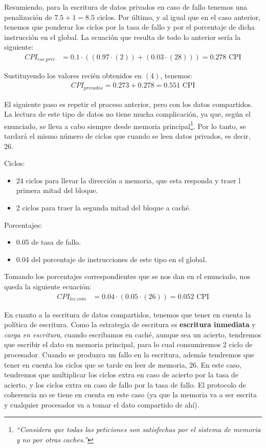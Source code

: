 \documentclass[12pt,a4paper]{article}
\begin{document}
Resumiendo, para la escritura de datos privados en caso de fallo tenemos una penalización de $7.5+1=8.5$ ciclos. Por último, y al igual que en el caso anterior, tenemos que ponderar los ciclos por la tasa de fallo y por el porcentaje de dicha instrucción en el global. La ecuación que resulta de todo lo anterior sería la siguiente:
\begin{align*}
CPI_{esc.priv}&=0.1\cdot ((0.97\cdot (2))+(0.03\cdot (28)))=0.278\text{ CPI}
\end{align*}

Sustituyendo los valores recién obtenidos en $(4)$, tenemos:
\begin{align*}
CPI_{privados}=0.273+0.278=0.551 \text{ CPI}
\end{align*}

El siguiente paso es repetir el proceso anterior, pero con los datos compartidos. La lectura de este tipo de datos no tiene mucha complicación, ya que, según el enunciado, se lleva a cabo siempre desde memoria principal\footnote{\textit{``Considera que todas las peticiones son satisfechas por el sistema de memoria y no por otras caches.''}}. Por lo tanto, se tardará el mismo número de ciclos que cuando se leen datos privados, es decir, 26. 

Ciclos:
\begin{itemize}
\item 24 ciclos para llevar la dirección a memoria, que esta responda y traer l primera mitad del bloque.
\item 2 ciclos para traer la segunda mitad del bloque a caché.
\end{itemize}

Porcentajes:
\begin{itemize}
\item 0.05 de tasa de fallo.
\item 0.04 del porcentaje de instrucciones de este tipo en el global.
\end{itemize}

Tomando los porcentajes correspondientes que se nos dan en el enunciado, nos queda la siguiente ecuación:
\begin{align*}
CPI_{lec.com}&=0.04\cdot (0.05\cdot (26))=0.052\text{ CPI}
\end{align*}

En cuanto a la escritura de datos compartidos, tenemos que tener en cuenta la política de escritura. Como la estrategia de escritura es \textbf{escritura inmediata} y \textit{carga en escritura}, cuando escribamos en caché, aunque sea un acierto, tendremos que escribir el dato en memoria principal, para lo cual consumiremos 2 ciclo de procesador. Cuando se produzca un fallo en la escritura, además tendremos que tener en cuenta los ciclos que se tarde en leer de memoria, 26. En este caso, tendremos que multiplicar los ciclos extra en caso de acierto por la tasa de acierto, y los ciclos extra en caso de fallo por la tasa de fallo. El protocolo de coherencia no se tiene en cuenta en este caso (ya que la memoria va a ser escrita y cualquier procesador va a tomar el dato compartido de ahí). \\
\end{document}
